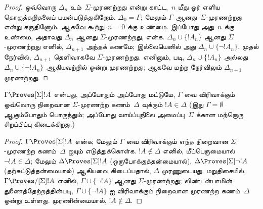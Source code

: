 \documentclass[../../../include/open-logic-section]{subfiles}
\begin{document}
\begin{proof}
ஒவ்வொரு $\Delta_n$ உம்~$\Sigma$-முரணற்றது என்று காட்ட,~$n$ மீது ஓர்
எளிய தொகுத்தறிதலைப் பயன்படுத்துகிறோம். $\Delta_0 = \Gamma$; மேலும்
$\Gamma$ ஆனது~$\Sigma$-முரணற்றது என்று கருதினோம். ஆகவே கூற்று~$n = 0$
க்கு உண்மை. இப்போது அது~$n$ க்கு உண்மை, அதாவது $\Delta_n$ ஆனது
$\Sigma$-முரணற்றது, என்க. $\Delta_n \cup \{!A_n\}$ ஆனது
$\Sigma$-முரணற்றது எனில், $\Delta_{n+1}$ அந்தக் கணமே; இல்லையெனில் அது
$\Delta_n \cup \{\lnot!A_n\}$. முதல் நேர்வில், $\Delta_{n+1}$
தெளிவாகவே $\Sigma$-முரணற்றது. எனினும்,
படி, $\Delta_n \cup \{!A_n\}$ அல்லது $\Delta_n \cup \{\lnot!A_n\}$
ஆகியவற்றில் ஒன்று முரணற்றது; ஆகவே மற்ற நேர்விலும் $\Delta_{n+1}$
முரணற்றது.
\end{proof}

\begin{cor}
  $\Gamma \Proves[\Sigma] !A$ என்பது, அப்போதும் அப்போது மட்டுமே,
  $\Gamma$ வை விரிவாக்கும் ஒவ்வொரு நிறைவான $\Sigma$-முரணற்ற
  கணம்~$\Delta$ வுக்கும் $!A \in \Delta$ (இது $\Gamma = \emptyset$
  ஆகும்போதும் பொருந்தும்; அப்போது வாய்ப்புநிலை அமைப்பு~$\Sigma$ க்கான
  மற்றொரு சிறப்பிப்பு கிடைக்கிறது.)
\end{cor}

\begin{proof}
  $\Gamma \Proves[\Sigma] !A$ என்க; மேலும் $\Gamma$ வை விரிவாக்கும்
  எந்த நிறைவான $\Sigma$-முரணற்ற கணம்~$\Delta$ ஐயும் எடுத்துக்கொள்க.
  $!A \notin \Delta$ எனில், மீப்பெருமையால் $\lnot!A \in \Delta$;
  மேலும் $\Delta \Proves[\Sigma] !A$ (ஒருபோக்குத்தன்மையால்),
  $\Delta \Proves[\Sigma] \lnot!A$ (தற்சுட்டுத்தன்மையால்) ஆகியவை
  கிடைப்பதால், $\Delta$ முரணுடையது. மறுதிசையில், $\Gamma
  \Proves/[\Sigma] !A$ எனில், $\Gamma \cup \{ \lnot!A\}$ ஆனது
  $\Sigma$-முரணற்றது; லிண்டன்பாமின் துணைத்தேற்றத்தின்படி, $\Gamma \cup
  \{ \lnot!A \}$ ஐ விரிவாக்கும் நிறைவான முரணற்ற கணம்~$\Delta$ ஒன்று
  உள்ளது. முரணின்மையால், $!A \notin \Delta$.
\end{proof}
\end{document}
